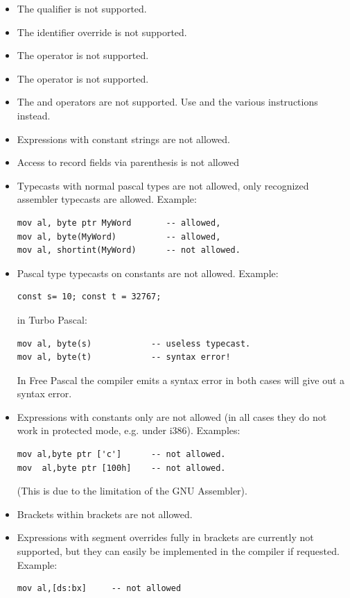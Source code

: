 \begin{itemize}
\item The  qualifier is not supported.
\item The \var{\&} identifier override is not supported.
\item The  operator is not supported.
\item The  operator is not supported.
\item The  and  operators are not supported.
      Use  and the various  instructions instead.
\item Expressions with constant strings are not allowed.
\item Access to record fields via parenthesis is not allowed
\item Typecasts with normal pascal types are not allowed, only
    recognized assembler typecasts are allowed. Example:
\begin{verbatim}
mov al, byte ptr MyWord       -- allowed,
mov al, byte(MyWord)          -- allowed,
mov al, shortint(MyWord)      -- not allowed.
\end{verbatim}
\item Pascal type typecasts on constants are not allowed.
Example:
\begin{verbatim}
const s= 10; const t = 32767;
\end{verbatim}
in Turbo Pascal:
\begin{verbatim}
mov al, byte(s)            -- useless typecast.
mov al, byte(t)            -- syntax error!
\end{verbatim}
In Free Pascal the compiler emits a syntax error in both cases will give out a syntax error.
\item Expressions with constants only are not allowed (in all cases they do not work in protected mode,
   e.g. under \linux i386). Examples:
\begin{verbatim}
mov al,byte ptr ['c']      -- not allowed.
mov  al,byte ptr [100h]    -- not allowed.
\end{verbatim}
 (This is due to the limitation of the GNU Assembler).
\item Brackets within brackets are not allowed.
\item Expressions with segment overrides fully in brackets are
currently not supported, but they can easily be implemented
in the compiler if requested. Example:
\begin{verbatim}
mov al,[ds:bx]     -- not allowed
\end{verbatim}

\end{itemize}
